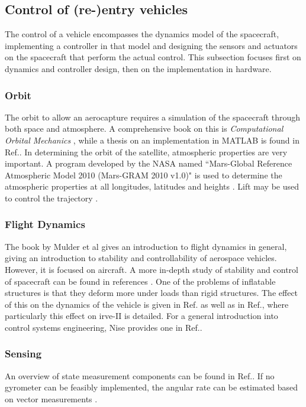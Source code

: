 \subsection{Control of (re-)entry vehicles} \label{sec:control}
The control of a vehicle encompasses the dynamics model of the spacecraft, implementing a controller in that model and designing the sensors and actuators on the spacecraft that perform the actual control. This subsection focuses first on dynamics and controller design, then on the implementation in hardware.

\subsubsection{Orbit}
The orbit to allow an aerocapture requires a simulation of the spacecraft through both space and atmosphere. A comprehensive book on this is \textit{Computational Orbital Mechanics} \cite{Weiland2004}, while a thesis on an implementation in MATLAB is found in Ref.\cite{Leszczynski1998}. In determining the orbit of the satellite, atmospheric properties are very important. A program developed by the NASA named ``Mars-Global Reference Atmospheric Model 2010 (Mars-GRAM 2010 v1.0)" is used to determine the atmospheric properties at all longitudes, latitudes and heights \cite{Justus2001}. Lift may be used to control the trajectory \cite{Esmaelzadeh2010}.

\subsubsection{Flight Dynamics}
The book by Mulder et al \cite{Mulder2013} gives an introduction to flight dynamics in general, giving an introduction to stability and controllability of aerospace vehicles. However, it is focused on aircraft. A more in-depth study of stability and control of spacecraft can be found in references \cite{Steketee1967, Ito2002}. One of the problems of inflatable structures is that they deform more under loads than rigid structures. The effect of this on the dynamics of the vehicle is given in Ref.\cite{Axdahl2009} as well as in Ref.\cite{Bose2009}, where particularly this effect on \gls{irve}-II is detailed. For a general introduction into control systems engineering, Nise provides one in Ref.\cite{Nise2011}.

\subsubsection{Sensing}
An overview of state measurement components can be found in Ref.\cite{Wertz2011}. If no gyrometer can be feasibly implemented, the angular rate can be estimated based on vector measurements \cite{Azor1998}.

